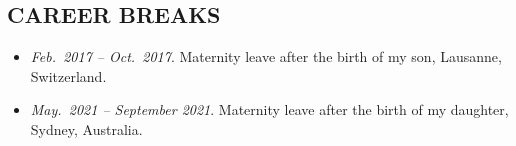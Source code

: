 
\subsection{CAREER BREAKS}
\vspace{2pt}

\begin{itemize}
    \item[] \textit{Feb.\ 2017 -- Oct.\ 2017}. Maternity leave after the birth of my son, Lausanne, Switzerland.
    \item[] \textit{May.\ 2021 -- September 2021}. Maternity leave after the birth of my daughter, Sydney, Australia.
\end{itemize}
